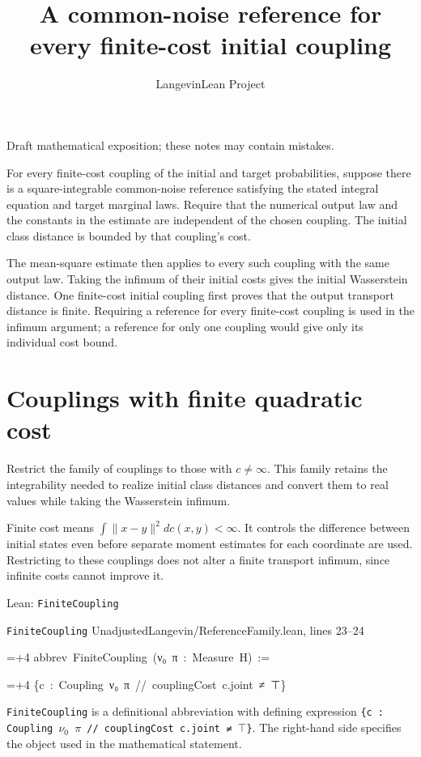 \documentclass[11pt,a4paper]{article}
\title{\texorpdfstring{A common-noise reference for every finite-cost initial coupling}{A common-noise reference for every finite-cost initial coupling}}
\author{LangevinLean Project}
\date{}
\newlength{\leancharwidth}
\newenvironment{leancode}{\par\smallskip\begingroup\ttfamily\footnotesize\raggedright
  \settowidth{\leancharwidth}{M}\setlength{\parskip}{0pt}\setlength{\parindent}{0pt}
  \frenchspacing}{\par\endgroup\smallskip}
\newcommand{\leanline}[2]{\hangindent=\dimexpr#1\leancharwidth+4\leancharwidth\relax
  \hangafter=1\noindent\hspace*{#1\leancharwidth}#2\par}
\newcommand{\leansource}[1]{\par{\footnotesize\color{leanmuted}#1}\par}
\newcommand{\leanlabel}[1]{\par\smallskip\noindent{\small\bfseries #1}\par}
\begin{document}
\maketitle
Draft mathematical exposition; these notes may contain mistakes.


For every finite-cost coupling of the initial and target probabilities, suppose there is a square-integrable common-noise reference satisfying the stated integral equation and target marginal laws. Require that the numerical output law and the constants in the estimate are independent of the chosen coupling. The initial class distance is bounded by that coupling's cost.



The mean-square estimate then applies to every such coupling with the same output law. Taking the infimum of their initial costs gives the initial Wasserstein distance. One finite-cost initial coupling first proves that the output transport distance is finite. Requiring a reference for every finite-cost coupling is used in the infimum argument; a reference for only one coupling would give only its individual cost bound.


\section{\texorpdfstring{Couplings with finite quadratic cost}{Couplings with finite quadratic cost}}


Restrict the family of couplings to those with \(c\ne\infty\). This family retains the integrability needed to realize initial class distances and convert them to real values while taking the Wasserstein infimum.



Finite cost means \(\int\|x-y\|^2dc(x,y)<\infty\). It controls the difference between initial states even before separate moment estimates for each coordinate are used. Restricting to these couplings does not alter a finite transport infimum, since infinite costs cannot improve it.

\begin{leanbox}{Lean: \texttt{FiniteCoupling}}
\leansource{\texttt{FiniteCoupling} \quad UnadjustedLangevin/\allowbreak{}ReferenceFamily.lean, lines 23–24}
\begin{leancode}
\leanline{0}{abbrev\ FiniteCoupling\ (ν₀\ π\ :\ Measure\ H)\ :=}
\leanline{2}{\{c\ :\ Coupling\ ν₀\ π\ //\ couplingCost\ c.joint\ ≠\ ⊤\}}
\end{leancode}
\leanlabel{How the Lean proof follows the argument}
\texttt{Finite\allowbreak{}Coupling} is a definitional abbreviation with defining expression \texttt{\{c : Coupling \ensuremath{\nu}\ensuremath{{}_{0}} \ensuremath{\pi} /\allowbreak{}/\allowbreak{} coupling\allowbreak{}Cost c.\allowbreak{}joint ≠ \ensuremath{\top}\}}. The right-hand side specifies the object used in the mathematical statement.
\end{leanbox}
\end{document}
